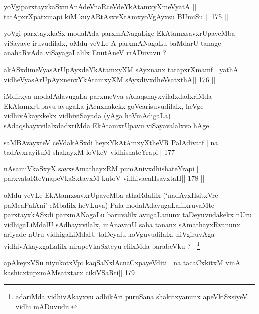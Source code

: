 \begin{shl}
yoVgiparxtayxkaSxmAnAdeVnaRceVdeYkAtamxyXmeVyatA ||
tatApxrXpatxmapi kiM kuyARtAsxvXtAmxyoVgAyxsu BUmiSu \hfill || 175 ||
\end{shl}

\begin{artha}
yoVgi parxtayxkaSx modalAda parxmANagaLige EkAtamxsavxrUpaveMba viSayave iruvudilalx, oMdu veVLe A parxmANagaLu baMdarU tanage anahaRvAda viSayagaLalilx EnutAneV mADuvavu ?
\end{artha}

\begin{shl}
akASxdimeVyasArUpAyxdeYkAtamxyXM sAyxnanx tatapxrXmamf |
yathA vidheVyasArUpAyxnenxYkAtamxyXM sAyxdivxdheVsatxthA\hfill || 176 ||
\end{shl}

\begin{artha}
iMdirxya modalAdavugaLa parxmeVya sAdaqshayxvilalxdadxriMda EkAtamxrUpavu avugaLa jAcnxnakekx goVcarisuvudilalx, heVge vidhivAkayxkekx vidhiviSayada (yAga hoVmAdigaLa) sAdaqshayxvilalxdadxriMda EkAtamxrUpavu viSayavalalxvo hAge.
\end{artha}

\begin{shl}
saMBAvayxteV ceVdakASxdi heyxYkAtAmxyXtheVR PalAdivatf |
na tadAvxrayituM shakayxM loVkeV vidhishateYrapi\hfill || 177 ||
\end{shl}

\begin{shl}
nAsamiVkaSxyX savxsAmathayxRM pumAnivxdhishateYrapi |
parxvataRteV\s napeVkaSxtavxM kutoV vidhivacaHsavxtaH\hfill || 178 ||
\end{shl}

\begin{artha}
oMdu veVLe EkAtamxsavxrUpaveMba athaRdalilx (`nadAyxHsitxVre paMcaPalAni' \break eMbalilx heVLuva) Pala modalAdavugaLalilxruvaMte parxtayxkASxdi parxmANagaLu baru\-valilx avugaLanunx taDeyuvudakekx nUru vidhigaLiMdalU sAdhayxvilalx, mAnavanU saha tananx sAmathayxRvanunx ariyade nUru vidhigaLiMdalU taDeyalu hoVguvudilalx, hiVgiru\-vAga vidhivAkayxgaLalilx nirapeVkaSxteyu elilxMda barabeVku ? ||\footnote[1]{adariMda vidhivAkayxvu adhikAri puruSana shakitxyanunx apeVkiSxsiyeV vidhi mADuvudu.}
\end{artha}


\begin{shl}
apAkeyxVSu niyukotxV\s pi kaqSaNxlAcnaCxpayeVditi |
na tacaCxkitxM vinA kashicxtupxmAMsatxtarx cikiVSaRti\hfill || 179 ||
\end{shl}


